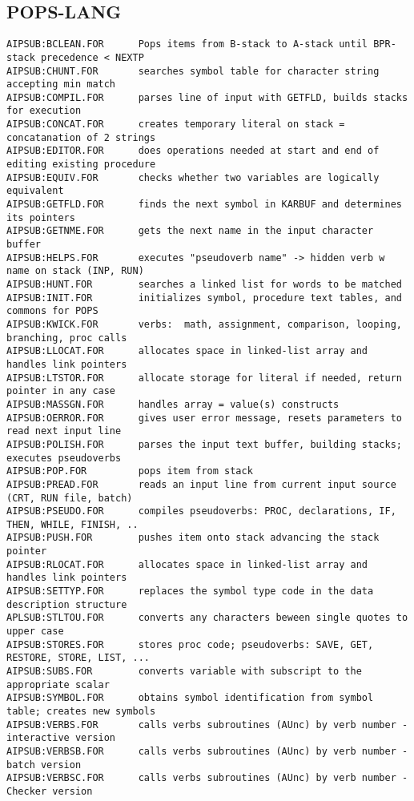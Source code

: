 \subsection{POPS-LANG}
\begin{verbatim}
AIPSUB:BCLEAN.FOR      Pops items from B-stack to A-stack until BPR-stack precedence < NEXTP
AIPSUB:CHUNT.FOR       searches symbol table for character string accepting min match
AIPSUB:COMPIL.FOR      parses line of input with GETFLD, builds stacks for execution
AIPSUB:CONCAT.FOR      creates temporary literal on stack = concatanation of 2 strings
AIPSUB:EDITOR.FOR      does operations needed at start and end of editing existing procedure
AIPSUB:EQUIV.FOR       checks whether two variables are logically equivalent
AIPSUB:GETFLD.FOR      finds the next symbol in KARBUF and determines its pointers
AIPSUB:GETNME.FOR      gets the next name in the input character buffer
AIPSUB:HELPS.FOR       executes "pseudoverb name" -> hidden verb w name on stack (INP, RUN)
AIPSUB:HUNT.FOR        searches a linked list for words to be matched
AIPSUB:INIT.FOR        initializes symbol, procedure text tables, and commons for POPS
AIPSUB:KWICK.FOR       verbs:  math, assignment, comparison, looping, branching, proc calls
AIPSUB:LLOCAT.FOR      allocates space in linked-list array and handles link pointers
AIPSUB:LTSTOR.FOR      allocate storage for literal if needed, return pointer in any case
AIPSUB:MASSGN.FOR      handles array = value(s) constructs
AIPSUB:OERROR.FOR      gives user error message, resets parameters to read next input line
AIPSUB:POLISH.FOR      parses the input text buffer, building stacks; executes pseudoverbs
AIPSUB:POP.FOR         pops item from stack
AIPSUB:PREAD.FOR       reads an input line from current input source (CRT, RUN file, batch)
AIPSUB:PSEUDO.FOR      compiles pseudoverbs: PROC, declarations, IF, THEN, WHILE, FINISH, ..
AIPSUB:PUSH.FOR        pushes item onto stack advancing the stack pointer
AIPSUB:RLOCAT.FOR      allocates space in linked-list array and handles link pointers
AIPSUB:SETTYP.FOR      replaces the symbol type code in the data description structure
APLSUB:STLTOU.FOR      converts any characters beween single quotes to upper case
AIPSUB:STORES.FOR      stores proc code; pseudoverbs: SAVE, GET, RESTORE, STORE, LIST, ...
AIPSUB:SUBS.FOR        converts variable with subscript to the appropriate scalar
AIPSUB:SYMBOL.FOR      obtains symbol identification from symbol table; creates new symbols
AIPSUB:VERBS.FOR       calls verbs subroutines (AUnc) by verb number - interactive version
AIPSUB:VERBSB.FOR      calls verbs subroutines (AUnc) by verb number - batch version
AIPSUB:VERBSC.FOR      calls verbs subroutines (AUnc) by verb number - Checker version
\end{verbatim}
 
